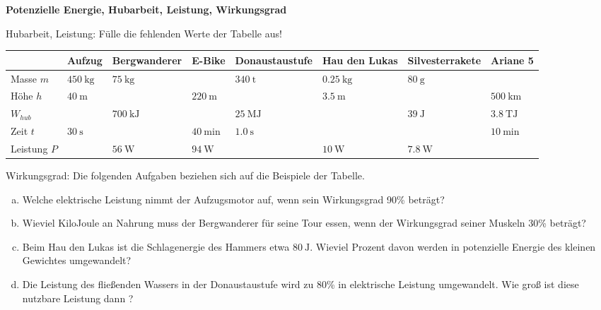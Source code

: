\documentclass[a4paper]{article}
\begin{document}
{\bf Potenzielle Energie, Hubarbeit, Leistung, Wirkungsgrad}

\begin{enumerate}[1.]
{\bf \item Hubarbeit, Leistung: Fülle die fehlenden Werte der Tabelle aus!}

\renewcommand{\arraystretch}{2}
\begin{tabular}{|p{}|p{}|p{}|p{}|p{}|p{}|p{}|p{}|}
\hline
             & Aufzug	& Berg\-wanderer & E-Bike & Donau\-staustufe & Hau den Lukas & Silvester\-rakete & Ariane 5  \\
\hline
Masse $m$    &$\SI{450}{\kilogram}$ &$\SI{75}{\kilogram}$ & &$\SI{340}{\tonne}$ &$\SI{0,25}{\kilogram}$ &$\SI{80}{\gram}$ & \\
\hline
Höhe $h$     &$\SI{40}{\meter}$ &  &$\SI{220}{\meter}$ &  &$\SI{3,5}{\meter}$ & &$\SI{500}{\kilo\meter}$ \\
\hline
$W_{hub}$    &  &$\SI{700}{\kilo\joule}$ & &$\SI{25}{\mega\joule}$ & &$\SI{39}{\joule}$ &$\SI{3,8}{\tera\joule}$ \\
\hline
Zeit $t$     &$\SI{30}{\second}$ &  &$\SI{40}{\minute}$ &$\SI{1,0}{\second}$ & &  &$\SI{10}{\minute}$ \\
\hline
Leistung $P$ &  &$\SI{56}{\watt}$ &$\SI{94}{\watt}$ & &$\SI{10}{\watt}$ &$\SI{7,8}{\watt}$ & \\
\hline
\end{tabular}

{\bf \item Wirkungsgrad: Die folgenden Aufgaben beziehen sich auf die Beispiele der Tabelle. }

\begin{enumerate}[a)]
	\item Welche elektrische Leistung nimmt der Aufzugsmotor auf, wenn sein Wirkungsgrad 90\% beträgt?
	\item Wieviel KiloJoule an Nahrung muss der Bergwanderer für seine Tour essen, wenn der Wirkungsgrad seiner Muskeln 30\% beträgt?
	\item Beim Hau den Lukas ist die Schlagenergie des Hammers etwa $\SI{80}{\joule}$. Wieviel Prozent davon werden in potenzielle Energie des kleinen Gewichtes umgewandelt?
	\item Die Leistung des fließenden Wassers in der Donaustaustufe wird zu 80\% in elektrische Leistung umgewandelt. Wie groß ist diese nutzbare Leistung dann ?

\end{enumerate} 


\end{enumerate} 
\end{document}
